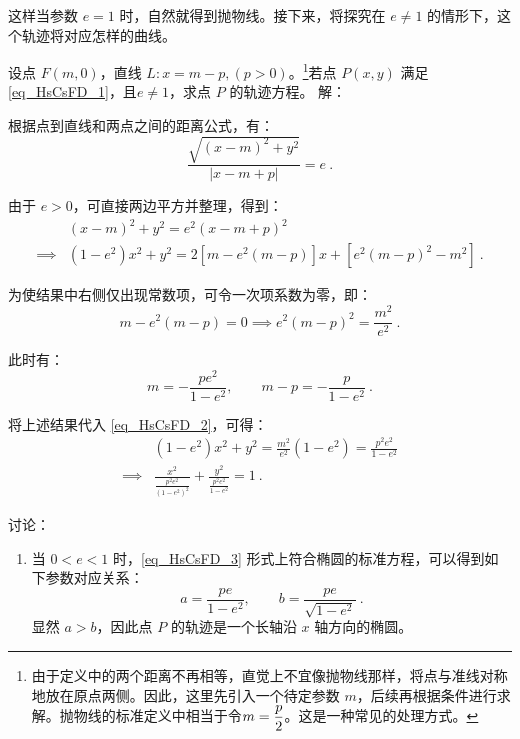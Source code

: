 这样当参数 $e = 1$ 时，自然就得到抛物线。接下来，将探究在 $e \ne 1$ 的情形下，这个轨迹将对应怎样的曲线。

\begin{example}{设点 $F(m,0)$，直线 $L : x = m - p,(p>0)$。\footnote{由于定义中的两个距离不再相等，直觉上不宜像抛物线那样，将点与准线对称地放在原点两侧。因此，这里先引入一个待定参数 $m$，后续再根据条件进行求解。抛物线的标准定义中相当于令$\displaystyle m={p\over2}$。这是一种常见的处理方式。}若点 $P(x,y)$ 满足 \autoref{eq_HsCsFD_1}，且$e\neq 1$，求点 $P$ 的轨迹方程。}\label{ex_HsCsFD_1}
解：

根据点到直线和两点之间的距离公式，有：
\begin{equation}\label{eq_HsCsFD_7}
\frac{\sqrt{(x - m)^2 + y^2}}{|x - m + p|} = e~.
\end{equation}

由于 $e > 0$，可直接两边平方并整理，得到：
\begin{equation}\label{eq_HsCsFD_2}
\begin{split}
&(x - m)^2 + y^2 = e^2(x - m + p)^2\\
\implies &(1 - e^2)x^2 + y^2 = 2[m - e^2(m - p)]x + [e^2(m - p)^2 - m^2]~.
\end{split}
\end{equation}

为使结果中右侧仅出现常数项，可令一次项系数为零，即：
\begin{equation}
m - e^2(m - p) = 0\implies e^2(m - p)^2 = \frac{m^2}{e^2}~.
\end{equation}

此时有：
\begin{equation}\label{eq_HsCsFD_5}
m = -\frac{pe^2}{1 - e^2}, \qquad m-p= -\frac{p}{1 - e^2}~.
\end{equation}

将上述结果代入 \autoref{eq_HsCsFD_2}，可得：
\begin{equation}\label{eq_HsCsFD_3}
\begin{split}
&(1 - e^2)x^2 + y^2 = \frac{m^2}{e^2}(1 - e^2) = \frac{p^2 e^2}{1 - e^2}\\
\implies&\frac{x^2}{\displaystyle\frac{p^2 e^2}{(1 - e^2)^2}} + \frac{y^2}{\displaystyle\frac{p^2 e^2}{1 - e^2}} = 1~.
\end{split}
\end{equation}

讨论：
\begin{enumerate}
\item 当 $0 < e < 1$ 时，\autoref{eq_HsCsFD_3} 形式上符合椭圆的标准方程，可以得到如下参数对应关系：
\begin{equation}
a = \frac{p e}{1 - e^2}, \qquad b = \frac{p e}{\sqrt{1 - e^2}}~.
\end{equation}
显然 $a > b$，因此点 $P$ 的轨迹是一个长轴沿 $x$ 轴方向的椭圆。


\end{enumerate}
\end{example}
